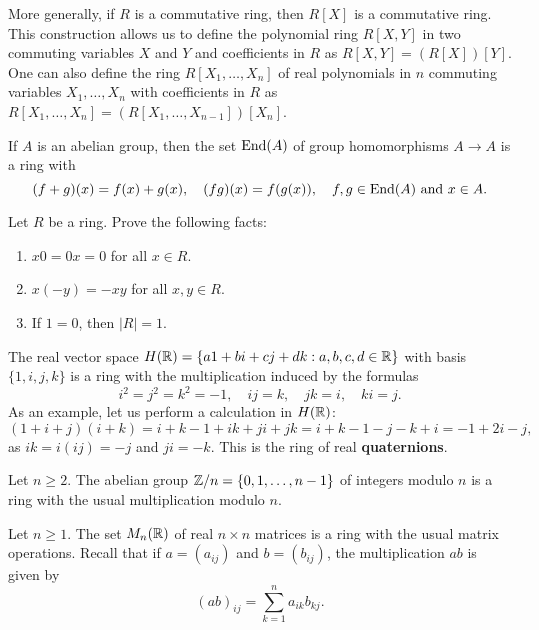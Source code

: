 More generally, if $R$ is a commutative ring, then $R[X]$ is a commutative ring. This construction
allows us to define 
the polynomial ring $R[X,Y]$ in two commuting variables $X$ and $Y$ and coefficients in $R$ as 
$R[X,Y]=(R[X])[Y]$. One can also define the ring  
$R[X_1,\dots,X_n]$ of real polynomials 
in $n$ commuting variables $X_1,\dots,X_n$ with coefficients in $R$ as 
$R[X_1,\dots,X_n]
=(R[X_1,\dots,X_{n-1}])[X_n]$.

\begin{example}
    If $A$ is an abelian group, then 
    the set 
    $\operatorname{End}(A)$ of group homomorphisms $A\to A$ is a ring with
    \[
    (f+g)(x)=f(x)+g(x),\quad
    (fg)(x)=f(g(x)),\quad f,g\in\operatorname{End}(A)\text{ and }x\in A.
    \]
\end{example}

\begin{exercise}
Let $R$ be a ring. Prove the following facts: 
\begin{enumerate}
    \item $x0=0x=0$ for all $x\in R$.
    \item $x(-y)=-xy$ for all $x,y\in R$.
    \item If $1=0$, then $|R|=1$. 
\end{enumerate}
\end{exercise}

\begin{example}
    The real vector space $H(\mathbb{R})=\{a1+bi+cj+dk:a,b,c,d\in\mathbb{R}\}$ with basis $\{1,i,j,k\}$ 
    is a ring with the multiplication induced by
    the formulas 
    \[
    i^2=j^2=k^2=-1,
    \quad ij=k,
    \quad jk=i,
    \quad ki=j.
    \]
    As an example, let us perform a calculation in $H(\mathbb{R})$: 
    \[
    (1+i+j)(i+k)=i+k-1+ik+ji+jk=i+k-1-j-k+i=-1+2i-j,
    \]
    as $ik=i(ij)=-j$ and $ji=-k$. This is the ring of real \textbf{quaternions}.
\end{example}

\begin{example}
    Let $n\geq2$. 
    The abelian group $\mathbb{Z}/n=\{0,1,\dots,n-1\}$ of integers modulo $n$ is a ring 
    with the usual multiplication modulo $n$. 
\end{example}

\begin{example}
    Let $n\geq1$. 
    The set $M_n(\mathbb{R})$ of real $n\times n$ matrices is a ring with the usual matrix operations. Recall
    that if $a=(a_{ij})$ and $b=(b_{ij})$, the multiplication $ab$ is given by
    \[
    (ab)_{ij}=\sum_{k=1}^n a_{ik}b_{kj}.
    \]
\end{example}

